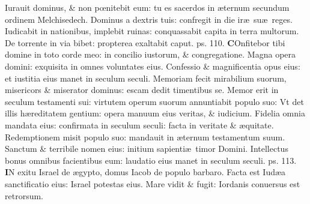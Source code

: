 \documentclass[a5paper,10pt]{book}
\def\ae{æ}
\def\oe{œ}
\begin{document}
\begin{multicols*}{2}
\newline \color{red} I\color{black}urauit dominus, \& non p\oe nitebit eum: tu es sacerdos in \ae ternum secundum ordinem Melchisedech.
\newline \color{red} D\color{black}ominus a dextris tuis: confregit in die ir\ae \ su\ae \ reges.
\newline \color{red} I\color{black}udicabit in nationibus, implebit ruinas: conquassabit capita in terra multorum.
\newline \color{red} D\color{black}e torrente in via bibet: propterea exaltabit caput. \quad \color{red} ps. 110. \color{black}
\vspace{-.5em}
\lettrine[lines=2]{\bfseries \color{red} C}{}Onfitebor tibi domine in toto corde meo: in concilio iustorum, \& congregatione.%
\newline \color{red} M\color{black}agna opera domini: exquisita in omnes voluntates eius.
\newline \color{red} C\color{black}onfessio \& magnificentia opus eius: et iustitia eius manet in seculum seculi.
\newline \color{red} M\color{black}emoriam fecit mirabilium suorum, misericors \& miserator dominus: escam dedit timentibus se.
\newline \color{red} M\color{black}emor erit in seculum testamenti sui: virtutem operum suorum annuntiabit populo suo:
\newline \color{red} V\color{black}t det illis h\ae reditatem gentium: opera manuum eius veritas, \& iudicium.
\newline \color{red} F\color{black}idelia omnia mandata eius: confirmata in seculum seculi: facta in veritate \& \ae quitate.
\newline \color{red} R\color{black}edemptionem misit populo suo: mandauit in \ae ternum testamentum suum.
\newline \color{red} S\color{black}anctum \& terribile nomen eius: initium sapienti\ae \ timor Domini.
\newline \color{red} I\color{black}ntellectus bonus omnibus facientibus eum: laudatio eius manet in seculum seculi. \quad \color{red} ps. 113. \color{black}
\vspace{-.5em}
\lettrine[lines=2]{\bfseries \color{red} I}{}N exitu Israel de \ae gypto, domus Iacob de populo barbaro.
\newline \color{red} F\color{black}acta est Iud\ae a sanctificatio eius: Israel potestas eius.
\newline \color{red} M\color{black}are vidit \& fugit: Iordanis conuersus est retrorsum.

\end{multicols*}
\end{document}
